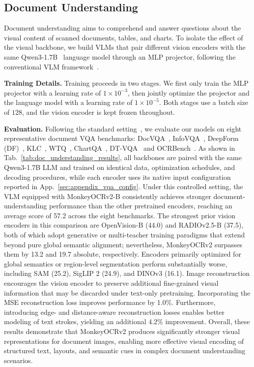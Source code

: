 \documentclass{article}
\begin{document}
\subsection{Document Understanding}
\label{sec:doc_understanding}
    Document understanding aims to comprehend and answer questions about the visual content of scanned documents, tables, and charts. To isolate the effect of the visual backbone, we build VLMs that pair different vision encoders with the same Qwen3-1.7B~\cite{qwen3} language model through an MLP projector, following the conventional VLM framework~\cite{llava1.5}.

    \textbf{Training Details.} Training proceeds in two stages. We first only train the MLP projector with a learning rate of $1 \times 10^{-3}$, then jointly optimize the projector and the language model with a learning rate of $1 \times 10^{-5}$. Both stages use a batch size of $128$, and the vision encoder is kept frozen throughout.
    
    \textbf{Evaluation.} Following the standard setting~\cite{textmonkey}, we evaluate our models on eight representative document VQA benchmarks: 
    DocVQA~\cite{docvqa}, InfoVQA~\cite{infovqa}, DeepForm (DF)~\cite{deepform}, KLC~\cite{klc}, WTQ~\cite{wtq}, ChartQA~\cite{chartqa}, DT-VQA~\cite{dtvqa} and OCRBench~\cite{ocrbench}. As shown in Tab.~\ref{tab:doc_understanding_results}, all backbones are paired with the same Qwen3-1.7B LLM and trained on identical data, optimization schedules, and decoding procedures, while each encoder uses its native input configuration reported in App.~\ref{sec:appendix_vqa_config}.
    Under this controlled setting, the VLM equipped with MonkeyOCRv2-B consistently achieves stronger document-understanding performance than the other pretrained encoders, reaching an average score of 57.2 across the eight benchmarks. The strongest prior vision encoders in this comparison are OpenVision-B (44.0) and RADIOv2.5-B (37.5), both of which adopt generative or multi-teacher training paradigms that extend beyond pure global semantic alignment; nevertheless, MonkeyOCRv2 surpasses them by 13.2 and 19.7 absolute, respectively. Encoders primarily optimized for global semantics or region-level segmentation perform substantially worse, including SAM (25.2), SigLIP 2 (24.9), and DINOv3 (16.1). 
    Image reconstruction encourages the vision encoder to preserve additional fine-grained visual information that may be discarded under text-only pretraining.
    Incorporating the MSE reconstruction loss improves performance by 1.0\%. Furthermore, introducing edge- and distance-aware reconstruction losses enables better modeling of text strokes, yielding an additional 4.2\% improvement.
    Overall, these results demonstrate that MonkeyOCRv2 produces significantly stronger visual representations for document images, enabling more effective visual encoding of structured text, layouts, and semantic cues in complex document understanding scenarios.
\end{document}
